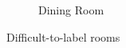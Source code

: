 \begin{figure}[H]
\begin{subfigure}{0.3\textwidth}
    \caption{Dining Room}
  \end{subfigure}
  \caption{Difficult-to-label rooms}
  \label{fig:appb2}
\end{figure}
